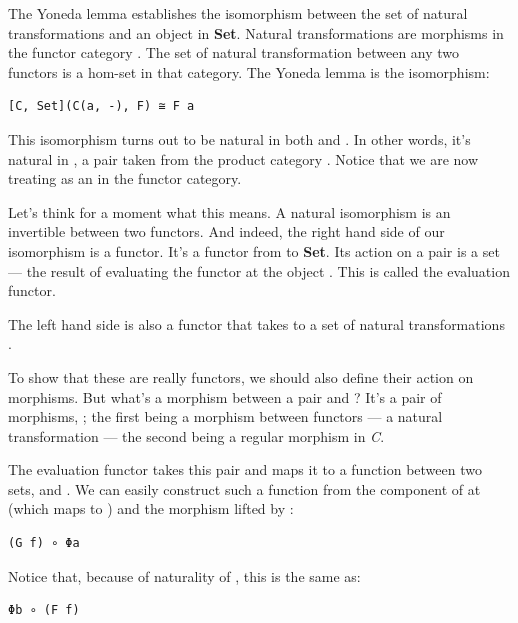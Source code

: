 The Yoneda lemma establishes the isomorphism between the set of natural
transformations and an object in \textbf{Set}. Natural transformations
are morphisms in the functor category \code{{[}C,\ Set{]}}. The set of
natural transformation between any two functors is a hom-set in that
category. The Yoneda lemma is the isomorphism:

\begin{verbatim}
[C, Set](C(a, -), F) ≅ F a
\end{verbatim}

This isomorphism turns out to be natural in both  and
. In other words, it's natural in , a pair
taken from the product category . Notice
that we are now treating  as an  in the functor
category.

Let's think for a moment what this means. A natural isomorphism is an
invertible  between two functors. And
indeed, the right hand side of our isomorphism is a functor. It's a
functor from  to \textbf{Set}. Its action on
a pair  is a set --- the result of evaluating the
functor  at the object . This is called the
evaluation functor.

The left hand side is also a functor that takes  to a
set of natural transformations .

To show that these are really functors, we should also define their
action on morphisms. But what's a morphism between a pair
 and ? It's a pair of morphisms,
; the first being a morphism between functors --- a
natural transformation --- the second being a regular morphism in
\emph{C}.

The evaluation functor takes this pair  and maps it to a
function between two sets,  and . We can
easily construct such a function from the component of  at
 (which maps  to ) and the morphism
 lifted by :

\begin{verbatim}
(G f) ∘ Φa
\end{verbatim}

Notice that, because of naturality of , this is the same as:

\begin{verbatim}
Φb ∘ (F f)
\end{verbatim}

